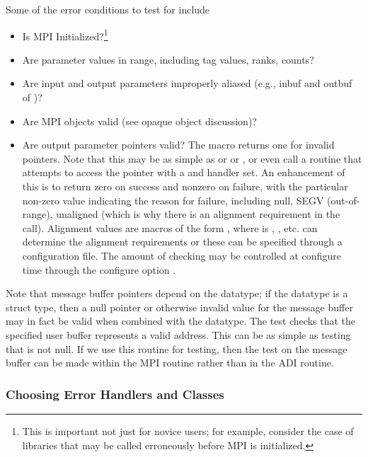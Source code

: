 \documentclass{article}
\begin{document}
Some of the error conditions to test for include
\begin{itemize}
\item Is MPI Initialized?\footnote{This is important not just for
novice users; for example, consider the case of libraries that may be
called erroneously before MPI is initialized.}
\item Are parameter values in range, including tag values, ranks, counts?
\item Are input and output parameters improperly aliased (e.g., inbuf and
  outbuf of   )?
\item Are MPI objects valid (see opaque object discussion)?
\item Are output parameter pointers valid?  The macro
   returns one for
invalid pointers. 
  Note that this may be as simple as  or
   or , or
  even call a routine that attempts to access the pointer with a
   and  handler set.  An enhancement of
this is to return 
zero on success and nonzero on failure, with the particular non-zero
value indicating the reason for failure, including null, SEGV
(out-of-range), unaligned (which is why there is an alignment
requirement in the call). Alignment values are macros of the form
, where  is , ,
etc.   can determine the alignment requirements or
these can be specified through a configuration file.
The amount of checking may be controlled at configure time through the
configure option .
\end{itemize}
Note that message buffer pointers depend on the datatype; if the datatype is a
struct type, then a null pointer or otherwise invalid value for the message
buffer may in fact be valid when combined with the datatype.
The test  checks that the
specified user buffer represents a valid address.  This can be as simple as
testing that  is not null.  If we
use 
this routine for testing, then the test on the message buffer can be made
within the MPI routine rather than in the ADI routine.

\subsubsection{Choosing Error Handlers and Classes}
\label{sec:chosing-errhandler}
\end{document}
